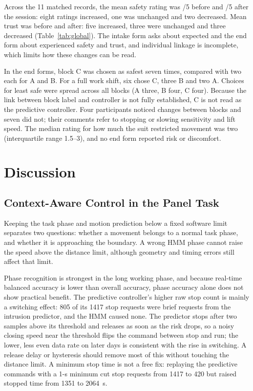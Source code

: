 \documentclass{IEEEtran}
\newcommand{\aidraft}[1]{#1}
\begin{document}
Across the 11 matched records, the mean safety rating was \SafetyPreMean{}/5
before and \SafetyPostMean{}/5 after the session: eight ratings increased, one
was unchanged and two decreased. Mean trust was \TrustPreMean{} before and
\TrustPostMean{} after: five increased, three were unchanged and three
decreased (Table~\ref{tab:global}). The intake form asks about expected and
the end form about experienced safety and trust, and individual linkage is
incomplete, which limits how these changes can be read.


In the end forms, block C was chosen as safest seven times, compared with two
each for A and B. For a full work shift, six chose C, three B and two A. Choices
for least safe were spread across all blocks (A three, B four, C four). Because
the link between block label and controller is not fully established, C is not
read as the predictive controller. Four participants noticed changes between
blocks and seven did not; their comments refer to stopping or slowing
sensitivity and lift speed. The median rating for how much the suit restricted
movement was two (interquartile range 1.5--3), and no end form reported risk or
discomfort.

\section{Discussion}
\subsection{Context-Aware Control in the Panel Task}
Keeping the task phase and motion prediction below a fixed software limit
separates two questions: whether a movement belongs to a normal task phase, and
whether it is approaching the boundary. A wrong HMM phase cannot raise the
speed above the distance limit, although geometry and timing errors still
affect that limit.

Phase recognition is strongest in the long working phase, and because real-time
balanced accuracy is lower than overall accuracy, phase accuracy alone does
not show practical benefit.
\aidraft{The predictive controller's higher raw stop count is mainly a switching
effect: 805 of its 1417 stop requests were brief requests from the intrusion
predictor, and the HMM caused none. The predictor stops after two samples above
its threshold and releases as soon as the risk drops, so a noisy closing speed
near the threshold flips the command between stop and run; the lower, less even
data rate on later days is consistent with the rise in switching. A release
delay or hysteresis should remove most of this without touching the distance
limit. A minimum stop time is not a free fix: replaying the predictive commands
with a 1-s minimum cut stop requests from 1417 to 420 but raised stopped time
from 1351 to 2064~s.}
\end{document}
